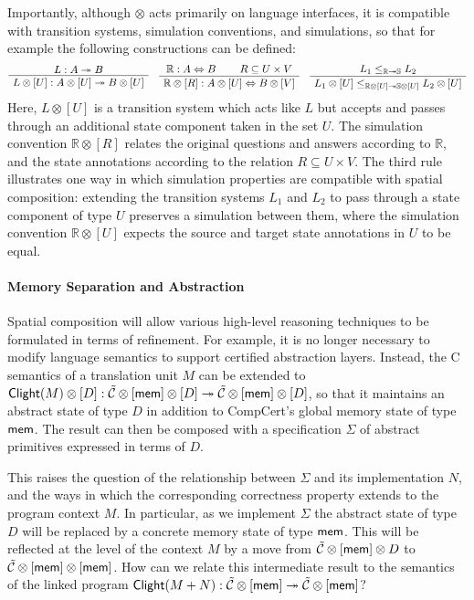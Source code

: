 Importantly,
although $\otimes$ acts primarily on language interfaces,
it is compatible with transition systems, simulation conventions, and
simulations, so that for example the following constructions can be defined:
\[
  \AxiomC{$L : A \twoheadrightarrow B$}
    \UnaryInfC{$L \otimes [U] : A \otimes [U] \twoheadrightarrow B \otimes [U]$}
    \DisplayProof
  \quad
  \AxiomC{$\mathbb{R} : A \Leftrightarrow B$}
    \AxiomC{$R \subseteq U \times V$}
    \BinaryInfC{$\mathbb{R} \otimes [R] : A \otimes [U] \Leftrightarrow B \otimes [V]$}
    \DisplayProof
  \quad
  \AxiomC{$L_1 \le_{\mathbb{R} \twoheadrightarrow \mathbb{S}} L_2$}
    \UnaryInfC{$L_1 \otimes [U]
      \le_{\mathbb{R} \otimes [U] \twoheadrightarrow \mathbb{S} \otimes [U]}
      L_2 \otimes [U]$}
    \DisplayProof
\]
Here, $L \otimes [U]$ is a transition system which acts like $L$
but accepts and passes through an additional state component taken in the set $U$.
The simulation convention $\mathbb{R} \otimes [R]$
relates the original questions and answers according to $\mathbb{R}$, and
the state annotations according to the relation $R \subseteq U \times V$.
The third rule illustrates one way in which
simulation properties are compatible with spatial composition:
extending the transition systems $L_1$ and $L_2$
to pass through a state component of type $U$ 
preserves a simulation between them,
where the simulation convention $\mathbb{R} \otimes [U]$
expects the source and target state annotations in $U$ to be equal.

\paragraph{Memory Separation and Abstraction}

Spatial composition will allow
various high-level reasoning techniques
to be formulated in terms of refinement.
For example,
it is no longer necessary to modify language semantics
to support certified abstraction layers.
Instead,
the C semantics of a translation unit $M$ can be extended to
$ \mathsf{Clight} (M) \otimes [D] :
 \mathcal{\tilde{C}} \otimes [ \mathsf{mem} ] \otimes [D] \twoheadrightarrow
 \mathcal{\tilde{C}} \otimes [ \mathsf{mem} ] \otimes [D]$,
so that it maintains an abstract state of type $D$
in addition to CompCert's global memory state of type $ \mathsf{mem} $.
The result can then be composed
with a specification $\Sigma$ of abstract primitives
expressed in terms of $D$.

This raises the question of the relationship between $\Sigma$ and its implementation $N$,
and the ways in which the corresponding correctness property
extends to the program context $M$.
In particular,
as we implement $\Sigma$ the abstract state of type $D$ will be replaced by
a concrete memory state of type $ \mathsf{mem} $.
This will be reflected at the level of the context $M$
by a move from $\mathcal{\tilde{C}} \otimes [ \mathsf{mem} ] \otimes D$
to $\mathcal{\tilde{C}} \otimes [ \mathsf{mem} ] \otimes [ \mathsf{mem} ]$.
How can we relate this intermediate result
to the semantics of the linked program
$ \mathsf{Clight} (M + N) :
 \mathcal{\tilde{C}} \otimes [ \mathsf{mem} ]
 \twoheadrightarrow
 \mathcal{\tilde{C}} \otimes [ \mathsf{mem} ]$?

